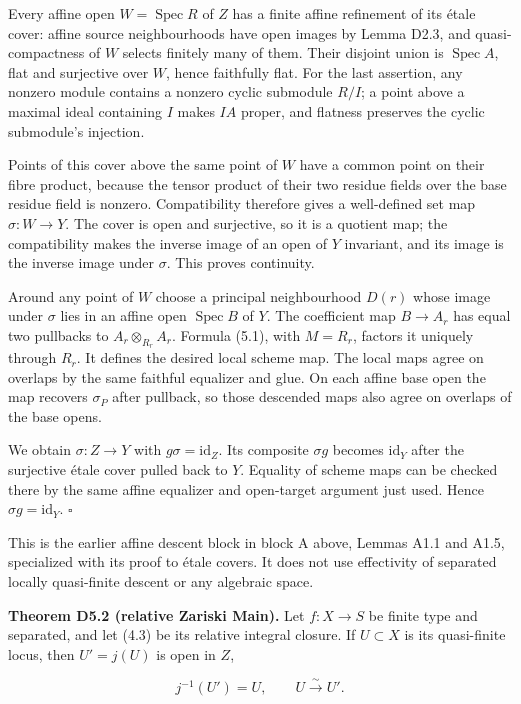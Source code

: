 \documentclass[11pt,a4paper,openany]{report}
\begin{document}
Every affine open \(W=\operatorname{Spec}R\) of \(Z\) has a finite affine refinement of its étale cover: affine source neighbourhoods have open images by Lemma D2.3, and quasi-compactness of \(W\) selects finitely many of them. Their disjoint union is \(\operatorname{Spec}A\), flat and surjective over \(W\), hence faithfully flat. For the last assertion, any nonzero module contains a nonzero cyclic submodule \(R/I\); a point above a maximal ideal containing \(I\) makes \(IA\) proper, and flatness preserves the cyclic submodule's injection.

Points of this cover above the same point of \(W\) have a common point on their fibre product, because the tensor product of their two residue fields over the base residue field is nonzero. Compatibility therefore gives a well-defined set map \(\sigma:W\to Y\). The cover is open and surjective, so it is a quotient map; the compatibility makes the inverse image of an open of \(Y\) invariant, and its image is the inverse image under \(\sigma\). This proves continuity.

Around any point of \(W\) choose a principal neighbourhood \(D(r)\) whose image under \(\sigma\) lies in an affine open \(\operatorname{Spec}B\) of \(Y\). The coefficient map \(B\to A_r\) has equal two pullbacks to \(A_r\otimes_{R_r}A_r\). Formula (5.1), with \(M=R_r\), factors it uniquely through \(R_r\). It defines the desired local scheme map. The local maps agree on overlaps by the same faithful equalizer and glue. On each affine base open the map recovers \(\sigma_P\) after pullback, so those descended maps also agree on overlaps of the base opens.

We obtain \(\sigma:Z\to Y\) with \(g\sigma=\mathrm{id}_Z\). Its composite \(\sigma g\) becomes \(\mathrm{id}_Y\) after the surjective étale cover pulled back to \(Y\). Equality of scheme maps can be checked there by the same affine equalizer and open-target argument just used. Hence \(\sigma g=\mathrm{id}_Y\). \(\square\)

This is the earlier affine descent block in block A above, Lemmas A1.1 and A1.5, specialized with its proof to étale covers. It does not use effectivity of separated locally quasi-finite descent or any algebraic space.

\textbf{Theorem D5.2 (relative Zariski Main).} Let \(f:X\to S\) be finite type and separated, and let (4.3) be its relative integral closure. If \(U\subset X\) is its quasi-finite locus, then \(U'=j(U)\) is open in \(Z\),

\[
j^{-1}(U')=U,\qquad U\xrightarrow{\sim}U'.                            \tag{5.2}
\]
\end{document}
